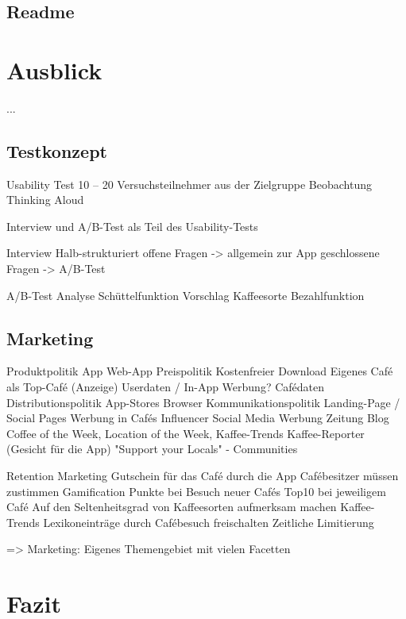 \section{Readme}






\chapter{Ausblick}
\label{ausblick}
...


\section{Testkonzept}

Usability Test
10 – 20 Versuchsteilnehmer aus der Zielgruppe
Beobachtung
Thinking Aloud

Interview und A/B-Test als Teil des Usability-Tests


Interview
Halb-strukturiert
offene Fragen -> allgemein zur App
geschlossene Fragen ->   A/B-Test

A/B-Test
Analyse Schüttelfunktion
Vorschlag Kaffeesorte
Bezahlfunktion



\section{Marketing}
Produktpolitik
App
Web-App
Preispolitik
Kostenfreier Download
Eigenes Café als Top-Café (Anzeige)
Userdaten / In-App Werbung?
Cafédaten
Distributionspolitik
App-Stores
Browser
Kommunikationspolitik
Landing-Page / Social Pages
Werbung in Cafés
Influencer
Social Media Werbung
Zeitung
Blog
Coffee of the Week, Location of the Week, Kaffee-Trends
Kaffee-Reporter (Gesicht für die App)
"Support your Locals" - Communities

Retention Marketing
Gutschein für das Café durch die App
Cafébesitzer müssen zustimmen
Gamification
Punkte bei Besuch neuer Cafés
Top10 bei jeweiligem Café
Auf den Seltenheitsgrad von Kaffeesorten aufmerksam machen
Kaffee-Trends
Lexikoneinträge durch Cafébesuch freischalten
Zeitliche Limitierung

=> Marketing: Eigenes Themengebiet mit vielen Facetten






\chapter{Fazit}
\label{fazit}


